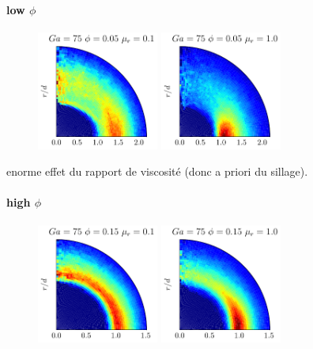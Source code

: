 \paragraph{low $\phi$}
\begin{figure}
\centering
\includegraphics[width=4cm]{image/HOMOGENEOUS/fDrop/Pnst_mu_r_0_1_Ga_75_PHI_0_05}
\includegraphics[width=4cm]{image/HOMOGENEOUS/fDrop/Pnst_mu_r_1_0_Ga_75_PHI_0_05}
\end{figure}

enorme effet du rapport de viscosité (donc a priori du sillage).


\paragraph{high $\phi$}
\begin{figure}
\centering
\includegraphics[width=4cm]{image/HOMOGENEOUS/fDrop/Pnst_mu_r_0_1_Ga_75_PHI_0_15}
\includegraphics[width=4cm]{image/HOMOGENEOUS/fDrop/Pnst_mu_r_1_0_Ga_75_PHI_0_15}
\end{figure}

